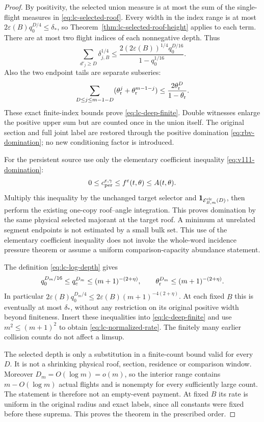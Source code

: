 \begin{proof}
By positivity, the selected union measure is at most the sum of the
single-flight measures in \eqref{eq:lc-selected-roof}.  Every width
in the index range is at most
$2\varepsilon(B)q_0^{D/4}\le\delta_*$, so
Theorem~\ref{thm:lc-selected-roof-height} applies to each term.
There are at most two flight indices of each nonnegative depth.  Thus
\[
 \sum_{d'_j\ge D}\delta_{j,B}^{1/4}
 \le\frac{2(2\varepsilon(B))^{1/4}q_0^{D/16}}
                                                {1-q_0^{1/16}}.
\]
Also the two endpoint tails are separate subseries:
\[
 \sum_{D\le j\le m-1-D}
       (\theta_{\rm r}^j+\theta_{\rm r}^{m-1-j})
                  \le\frac{2\theta_{\rm r}^D}{1-\theta_{\rm r}}.
\]
These exact finite-index bounds prove \eqref{eq:lc-deep-finite}.
Double witnesses enlarge the positive upper sum but are counted once
in the union itself.  The original section and full joint label are
restored through the positive domination
\eqref{eq:rbv-domination}; no new conditioning factor is introduced.

For the persistent source use only the elementary coefficient
inequality \eqref{eq:v111-domination}:
\[
       0\le c_{\rm per}^{\varepsilon,\gamma}
                         \le f^\varepsilon(t,\theta)\le A(t,\theta).
\]
Multiply this inequality by the unchanged target selector and
$\mathbf1_{\mathcal E^{\rm clr}_{B,m}(D)}$, then perform the existing
one-copy roof--angle integration.  This proves domination by the
same physical selected majorant at the target roof.  A minimum at
unrelated segment endpoints is not estimated by a small bulk set.
This use of the elementary coefficient inequality does not invoke
the whole-word incidence pressure theorem or assume a uniform
comparison-capacity abundance statement.

The definition \eqref{eq:lc-log-depth} gives
\[
 q_0^{D_m/16}\le q_{\rm c}^{D_m}
          \le(m+1)^{-(2+\eta)},\qquad
 \theta_{\rm r}^{D_m}\le(m+1)^{-(2+\eta)}.
\]
In particular
$2\varepsilon(B)q_0^{D_m/4}
 \le2\varepsilon(B)(m+1)^{-4(2+\eta)}$.
At each fixed $B$ this is eventually at most $\delta_*$, without
any restriction on its original positive width beyond finiteness.
Insert these inequalities into \eqref{eq:lc-deep-finite} and use
$m^2\le(m+1)^2$ to obtain \eqref{eq:lc-normalized-rate}.
The finitely many earlier collision counts do not affect a limsup.

The selected depth is only a substitution in a finite-count bound
valid for every $D$.  It is not a shrinking physical roof, section,
residence or comparison window.  Moreover $D_m=O(\log m)=o(m)$,
so the interior range contains $m-O(\log m)$ actual flights and
is nonempty for every sufficiently large count.  The statement is
therefore not an empty-event payment.  At fixed $B$ its rate is
uniform in the original radius and exact labels, since all constants
were fixed before these suprema.  This proves the theorem in the
prescribed order.
\end{proof}

